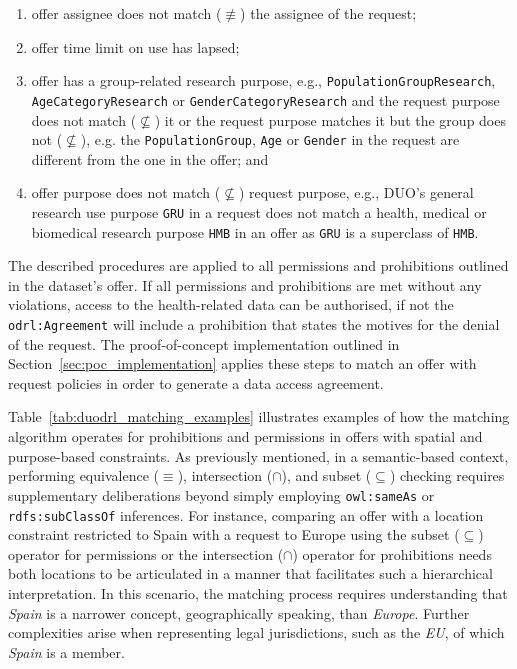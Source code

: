 \begin{enumerate}
    \item offer assignee does not match ($\not\equiv$) the assignee of the request; 
    \item offer time limit on use has lapsed;
    \item offer has a group-related research purpose, e.g., \texttt{PopulationGroupResearch}, \texttt{AgeCategoryResearch} or \texttt{GenderCategoryResearch} and the request purpose does not match ($\not\subseteq$) it or the request purpose matches it but the group does not ($\not\subseteq$), e.g. the \texttt{PopulationGroup}, \texttt{Age} or \texttt{Gender} in the request are different from the one in the offer; and
    \item offer purpose does not match ($\not\subseteq$) request purpose, e.g., DUO's general research use purpose \texttt{GRU} in a request does not match a health, medical or biomedical research purpose \texttt{HMB} in an offer as \texttt{GRU} is a superclass of \texttt{HMB}.
\end{enumerate}

The described procedures are applied to all permissions and prohibitions outlined in the dataset's offer.
If all permissions and prohibitions are met without any violations, access to the health-related data can be authorised, if not the \texttt{odrl:Agreement} will include a prohibition that states the motives for the denial of the request.
The proof-of-concept implementation outlined in Section~\ref{sec:poc_implementation} applies these steps to match an offer with request policies in order to generate a data access agreement.

Table~\ref{tab:duodrl_matching_examples} illustrates examples of how the matching algorithm operates for prohibitions and permissions in offers with spatial and purpose-based constraints.
As previously mentioned, in a semantic-based context, performing equivalence ($\equiv$), intersection ($\cap$), and subset ($\subseteq$) checking requires supplementary deliberations beyond simply employing \texttt{owl:sameAs} or \texttt{rdfs:subClassOf} inferences.
For instance, comparing an offer with a location constraint restricted to Spain with a request to Europe using the subset ($\subseteq$) operator for permissions or the intersection ($\cap$) operator for prohibitions needs both locations to be articulated in a manner that facilitates such a hierarchical interpretation.
In this scenario, the matching process requires understanding that \textit{Spain} is a narrower concept, geographically speaking, than \textit{Europe}.
Further complexities arise when representing legal jurisdictions, such as the \textit{EU}, of which \textit{Spain} is a member.

